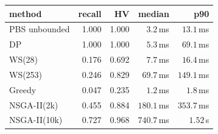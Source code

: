 \setlength{\tabcolsep}{3.5pt}%
\begin{tabular}{lrrrr}
\toprule
method & recall & HV & median & p90 \\
\midrule
PBS unbounded & 1.000 & 1.000 & $3.2$\,ms & $13.1$\,ms \\
DP & 1.000 & 1.000 & $5.3$\,ms & $69.1$\,ms \\
WS(28) & 0.176 & 0.692 & $7.7$\,ms & $16.4$\,ms \\
WS(253) & 0.246 & 0.829 & $69.7$\,ms & $149.1$\,ms \\
Greedy & 0.047 & 0.235 & $1.2$\,ms & $1.8$\,ms \\
NSGA-II(2k) & 0.455 & 0.884 & $180.1$\,ms & $353.7$\,ms \\
NSGA-II(10k) & 0.727 & 0.968 & $740.7$\,ms & $1.52$\,s \\
\bottomrule
\end{tabular}
